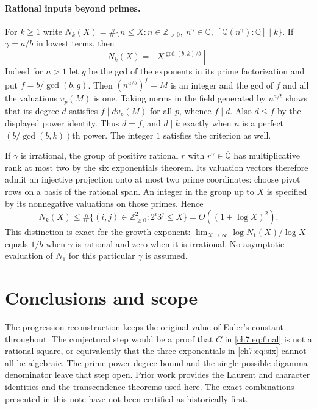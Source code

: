 \documentclass[11pt,a4paper,oneside,openany]{report}
\theoremstyle{remark}\newtheorem{remark}[theorem]{Remark}
\numberwithin{equation}{section}
\newcommand{\A}{\overline{\mathbb Q}}\newcommand{\B}{\mathcal B}
\begin{document}
\paragraph{Rational inputs beyond primes.}
For $k\ge1$ write $N_k(X)=\#\{n\le X:n\in\mathbb Z_{>0},\ n^\gamma\in\A,\ [\mathbb Q(n^\gamma):\mathbb Q]\mid k\}$. If $\gamma=a/b$ in lowest terms, then
\[
 N_k(X)=\left\lfloor X^{\gcd(b,k)/b}\right\rfloor.
\]
Indeed for $n>1$ let $g$ be the gcd of the exponents in its prime factorization and put $f=b/\gcd(b,g)$. Then $(n^{a/b})^f=M$ is an integer and the gcd of $f$ and all the valuations $v_p(M)$ is one. Taking norms in the field generated by $n^{a/b}$ shows that its degree $d$ satisfies $f\mid d v_p(M)$ for all $p$, whence $f\mid d$. Also $d\le f$ by the displayed power identity. Thus $d=f$, and $d\mid k$ exactly when $n$ is a perfect $(b/\gcd(b,k))$th power. The integer $1$ satisfies the criterion as well.

If $\gamma$ is irrational, the group of positive rational $r$ with $r^\gamma\in\A$ has multiplicative rank at most two by the six exponentials theorem. Its valuation vectors therefore admit an injective projection onto at most two prime coordinates: choose pivot rows on a basis of the rational span. An integer in the group up to $X$ is specified by its nonnegative valuations on those primes. Hence
\[
 N_k(X)\le\#\{(i,j)\in\mathbb Z_{\ge0}^2:2^i3^j\le X\}=O((1+\log X)^2).
\]
This distinction is exact for the growth exponent: $\lim_{X\to\infty}\log N_1(X)/\log X$ equals $1/b$ when $\gamma$ is rational and zero when it is irrational. No asymptotic evaluation of $N_1$ for this particular $\gamma$ is assumed.

\section*{Conclusions and scope}
The progression reconstruction keeps the original value of Euler's constant throughout. The conjectural step would be a proof that $C$ in \eqref{ch7:eq:final} is not a rational square, or equivalently that the three exponentials in \eqref{ch7:eq:six} cannot all be algebraic. The prime-power degree bound and the single possible digamma denominator leave that step open. Prior work provides the Laurent and character identities and the transcendence theorems used here. The exact combinations presented in this note have not been certified as historically first.

\end{document}
